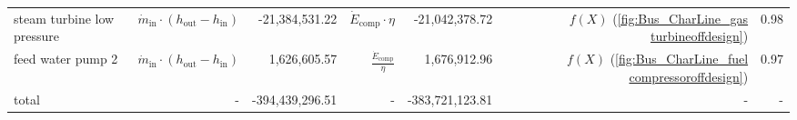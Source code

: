 \documentclass[]{article}
\begin{document}
\begin{table}[H]
\begin{tabular}{lrrrrrr}
steam turbine low pressure  &  $\dot{m}_\mathrm{in} \cdot \left(h_\mathrm{out} - h_\mathrm{in} \right)$ &                 -21,384,531.22 &    $\dot{E}_\mathrm{comp} \cdot \eta$ &                -21,042,378.72 &      $f\left(X\right)$ (\ref{fig:Bus_CharLine_gas turbineoffdesign}) &                   0.98 \\
feed water pump 2           &  $\dot{m}_\mathrm{in} \cdot \left(h_\mathrm{out} - h_\mathrm{in} \right)$ &                   1,626,605.57 &  $\frac{\dot{E}_\mathrm{comp}}{\eta}$ &                  1,676,912.96 &  $f\left(X\right)$ (\ref{fig:Bus_CharLine_fuel compressoroffdesign}) &                   0.97 \\
total                       &                                                                         - &                -394,439,296.51 &                                     - &               -383,721,123.81 &                                                                    - &                      - \\
\bottomrule
\end{tabular}
\end{table}
\end{document}
